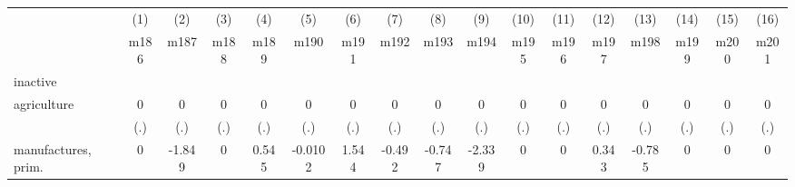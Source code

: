 {
\def\sym#1{\ifmmode^{#1}\else\(^{#1}\)\fi}
\begin{tabular}{l*{16}{c}}
\hline\hline
                    &\multicolumn{1}{c}{(1)}&\multicolumn{1}{c}{(2)}&\multicolumn{1}{c}{(3)}&\multicolumn{1}{c}{(4)}&\multicolumn{1}{c}{(5)}&\multicolumn{1}{c}{(6)}&\multicolumn{1}{c}{(7)}&\multicolumn{1}{c}{(8)}&\multicolumn{1}{c}{(9)}&\multicolumn{1}{c}{(10)}&\multicolumn{1}{c}{(11)}&\multicolumn{1}{c}{(12)}&\multicolumn{1}{c}{(13)}&\multicolumn{1}{c}{(14)}&\multicolumn{1}{c}{(15)}&\multicolumn{1}{c}{(16)}\\
                    &\multicolumn{1}{c}{m186}&\multicolumn{1}{c}{m187}&\multicolumn{1}{c}{m188}&\multicolumn{1}{c}{m189}&\multicolumn{1}{c}{m190}&\multicolumn{1}{c}{m191}&\multicolumn{1}{c}{m192}&\multicolumn{1}{c}{m193}&\multicolumn{1}{c}{m194}&\multicolumn{1}{c}{m195}&\multicolumn{1}{c}{m196}&\multicolumn{1}{c}{m197}&\multicolumn{1}{c}{m198}&\multicolumn{1}{c}{m199}&\multicolumn{1}{c}{m200}&\multicolumn{1}{c}{m201}\\
\hline
inactive            &                     &                     &                     &                     &                     &                     &                     &                     &                     &                     &                     &                     &                     &                     &                     &                     \\
agriculture         &           0         &           0         &           0         &           0         &           0         &           0         &           0         &           0         &           0         &           0         &           0         &           0         &           0         &           0         &           0         &           0         \\
                    &         (.)         &         (.)         &         (.)         &         (.)         &         (.)         &         (.)         &         (.)         &         (.)         &         (.)         &         (.)         &         (.)         &         (.)         &         (.)         &         (.)         &         (.)         &         (.)         \\
[1em]
manufactures, prim. &           0         &      -1.849         &           0         &       0.545         &     -0.0102         &       1.544         &      -0.492         &      -0.747         &      -2.339         &           0         &           0         &       0.343         &      -0.785         &           0         &           0         &           0         \\

\end{tabular}}
